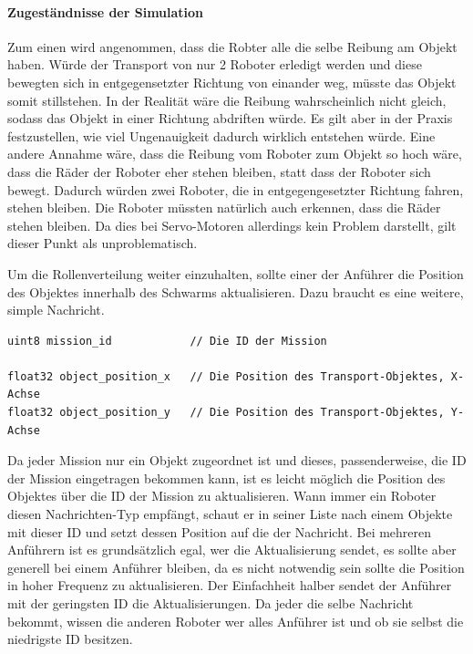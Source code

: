 \paragraph*{Zugeständnisse der Simulation}
Zum einen wird angenommen, dass die Robter alle die selbe Reibung am Objekt haben. Würde der Transport von nur 2 Roboter erledigt werden und diese bewegten sich in entgegensetzter Richtung von einander weg, müsste das Objekt somit stillstehen. In der Realität wäre die Reibung wahrscheinlich nicht gleich, sodass das Objekt in einer Richtung abdriften würde. Es gilt aber in der Praxis festzustellen, wie viel Ungenauigkeit dadurch wirklich entstehen würde.
Eine andere Annahme wäre, dass die Reibung vom Roboter zum Objekt so hoch wäre, dass die Räder der Roboter eher stehen bleiben, statt dass der Roboter sich bewegt. Dadurch würden zwei Roboter, die in entgegengesetzter Richtung fahren, stehen bleiben. Die Roboter müssten natürlich auch erkennen, dass die Räder stehen bleiben. Da dies bei Servo-Motoren allerdings kein Problem darstellt, gilt dieser Punkt als unproblematisch.

Um die Rollenverteilung weiter einzuhalten, sollte einer der Anführer die Position des Objektes innerhalb des Schwarms aktualisieren. Dazu braucht es eine weitere, simple Nachricht.

\begin{lstlisting}[style=ros, title=Nachrichten-Typ: Update\_Object.msg]
uint8 mission_id			// Die ID der Mission

float32 object_position_x	// Die Position des Transport-Objektes, X-Achse
float32 object_position_y	// Die Position des Transport-Objektes, Y-Achse
\end{lstlisting}

Da jeder Mission nur ein Objekt zugeordnet ist und dieses, passenderweise, die ID der Mission eingetragen bekommen kann, ist es leicht möglich die Position des Objektes über die ID der Mission zu aktualisieren. Wann immer ein Roboter diesen Nachrichten-Typ empfängt, schaut er in seiner Liste nach einem Objekte mit dieser ID und setzt dessen Position auf die der Nachricht. Bei mehreren Anführern ist es grundsätzlich egal, wer die Aktualisierung sendet, es sollte aber generell bei einem Anführer bleiben, da es nicht notwendig sein sollte die Position in hoher Frequenz zu aktualisieren. Der Einfachheit halber sendet der Anführer mit der geringsten ID die Aktualisierungen. Da jeder die selbe Nachricht bekommt, wissen die anderen Roboter wer alles Anführer ist und ob sie selbst die niedrigste ID besitzen.

